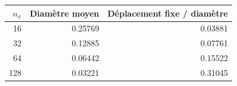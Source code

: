 \begin{tabular}{rrr}
\toprule
$n_x$ & Diamètre moyen & Déplacement fixe / diamètre \\
\midrule
16 & 0.25769 & 0.03881 \\
32 & 0.12885 & 0.07761 \\
64 & 0.06442 & 0.15522 \\
128 & 0.03221 & 0.31045 \\
\bottomrule
\end{tabular}
